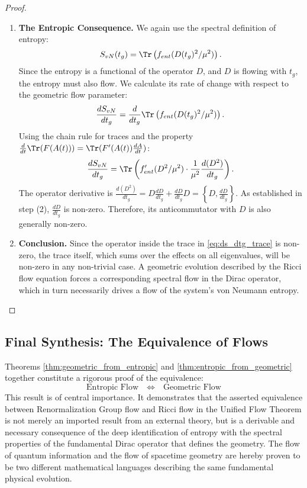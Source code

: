 \documentclass[11pt, letterpaper]{report}
\theoremstyle{plain} %
\theoremstyle{definition} %
\theoremstyle{remark} %
\begin{document}
\begin{proof}
\begin{enumerate}
    \item \textbf{The Entropic Consequence.} We again use the spectral definition of entropy:
    \begin{equation}
        S_{vN}(t_g) = \Tr\left( f_{ent}(D(t_g)^2/\mu^2) \right).
    \end{equation}
    Since the entropy is a functional of the operator $D$, and $D$ is flowing with $t_g$, the entropy must also flow. We calculate its rate of change with respect to the geometric flow parameter:
    \begin{equation}
        \frac{dS_{vN}}{dt_g} = \frac{d}{dt_g} \Tr\left( f_{ent}(D(t_g)^2/\mu^2) \right).
    \end{equation}
    Using the chain rule for traces and the property $\frac{d}{dt}\Tr(F(A(t))) = \Tr(F'(A(t))\frac{dA}{dt})$:
    \begin{equation}
        \frac{dS_{vN}}{dt_g} = \Tr\left( f'_{ent}(D^2/\mu^2) \cdot \frac{1}{\mu^2} \frac{d(D^2)}{dt_g} \right).
        \label{eq:ds_dtg_trace}
    \end{equation}
    The operator derivative is $\frac{d(D^2)}{dt_g} = D\frac{dD}{dt_g} + \frac{dD}{dt_g}D = \left\{D, \frac{dD}{dt_g}\right\}$. As established in step (2), $\frac{dD}{dt_g}$ is non-zero. Therefore, its anticommutator with $D$ is also generally non-zero.

    \item \textbf{Conclusion.} Since the operator inside the trace in \cref{eq:ds_dtg_trace} is non-zero, the trace itself, which sums over the effects on all eigenvalues, will be non-zero in any non-trivial case. A geometric evolution described by the Ricci flow equation forces a corresponding spectral flow in the Dirac operator, which in turn necessarily drives a flow of the system's von Neumann entropy.
\end{enumerate}
\end{proof}

\subsection{Final Synthesis: The Equivalence of Flows}

Theorems \ref{thm:geometric_from_entropic} and \ref{thm:entropic_from_geometric} together constitute a rigorous proof of the equivalence:
$$
\text{Entropic Flow} \quad \Longleftrightarrow \quad \text{Geometric Flow}
$$
This result is of central importance. It demonstrates that the asserted equivalence between Renormalization Group flow and Ricci flow in the Unified Flow Theorem is not merely an imported result from an external theory, but is a derivable and necessary consequence of the deep identification of entropy with the spectral properties of the fundamental Dirac operator that defines the geometry. The flow of quantum information and the flow of spacetime geometry are hereby proven to be two different mathematical languages describing the same fundamental physical evolution.
\end{document}
